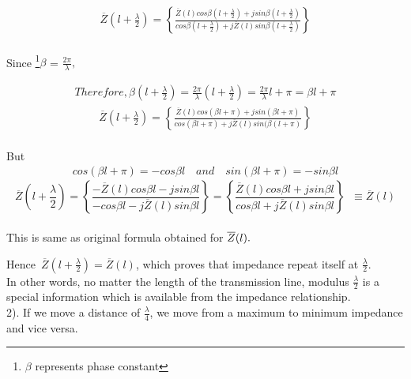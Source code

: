  \begin{align*}
 \overline{Z}(l+\frac{\lambda}{2}) = \left\lbrace \frac{\overline{Z}(l)cos\beta (l+\frac{\lambda}{2}) + jsin\beta (l+\frac{\lambda}{2})}{cos\beta (l+\frac{\lambda}{2}) + j\overline{Z}(l)sin\beta (l+\frac{\lambda}{2})}\right\rbrace 
 \end{align*}\\
 
 Since \footnote{$\beta$ represents phase constant}$\beta$ = $ \frac{2\pi}{\lambda},$
 
 \begin{align*}
 Therefore, \beta(l+\frac{\lambda}{2})=\frac{2\pi}{\lambda}(l+\frac{\lambda}{2})=\frac{2\pi}{\lambda}l+\pi=\beta l+\pi
 \end{align*}
 \begin{align*}
 \overline{Z}(l+\frac{\lambda}{2}) = \left\lbrace \frac{\overline{Z}(l)cos(\beta l+\pi) + jsin(\beta l+\pi)}{cos(\beta l+\pi) + j\overline{Z}(l)sin(\beta (l+\pi)}\right\rbrace 
 \end{align*}\\
 But 
 \begin{align*} 
 cos(\beta l+\pi)=-cos\beta l \quad and \quad sin(\beta l+\pi)=-sin\beta l
 \end{align*}
  \begin{dmath*}
  \overline{Z}(l+\frac{\lambda}{2})=\left\lbrace \frac{-\overline{Z}(l)cos\beta l - jsin\beta l}{-cos\beta l - j\overline{Z}(l)sin\beta l}\right\rbrace = \left\lbrace \frac{\overline{Z}(l)cos\beta l + jsin\beta l}{cos\beta l + j\overline{Z}(l)sin\beta l}\right\rbrace\;\;\equiv \overline{Z}(l)
 \end{dmath*}\\  
 This is same as original formula obtained for $\overline{Z}(l).\\$
 
Hence\ $\overline{Z}(l+\frac{\lambda}{2})
=\overline{Z}(l)$, which proves that impedance repeat itself at $\frac{\lambda}{2}$.\\
 
 In other words, no matter the length of the transmission line, modulus $\frac{\lambda}{2}$ is  a special information which is available from the impedance relationship.\\
 
 2).  If we move a distance of $\frac{\lambda}{4}$, we move from a maximum to minimum impedance and vice versa.\\
 
